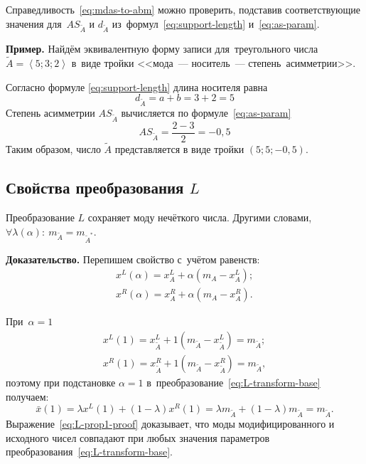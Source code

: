 Справедливость~\eqref{eq:mdas-to-abm} можно проверить, подставив соответствующие значения для~$AS_{\tilde A}$ и $d_{\tilde A}$ из~формул~\eqref{eq:support-length} и~\eqref{eq:as-param}.

\textbf{Пример.} Найдём эквивалентную форму записи для~треугольного числа $\tilde{A}=\left\langle 5;3;2 \right\rangle $ в~виде тройки <<мода~--- носитель~--- степень~асимметрии>>.

Согласно формуле \eqref{eq:support-length} длина носителя равна
\begin{equation*}
  d_{\tilde A}=a+b=3+2=5
\end{equation*}
Степень асимметрии $AS_{\tilde A}$ вычисляется по формуле~\eqref{eq:as-param}
\begin{equation*}
  AS_{\tilde A}=\frac{2-3}{2}=-0,5
\end{equation*}
Таким образом, число $\tilde{A}$ представляется в виде тройки $\left( 5;5;-0,5 \right)$.

\subsection{Свойства преобразования $L$}

\begin{prop}
\label{prop:L-prop1}
Преобразование $L$ сохраняет моду нечёткого числа. Другими словами, $\forall \lambda (\alpha ):\ m_{\tilde A}=m_{\tilde A^{*}}$.
\end{prop}
\textbf{Доказательство.} Перепишем свойство с~учётом равенств:
\begin{gather*}
  x^L(\alpha )=x_{A}^{L}+\alpha (m_A-x_{A}^{L}); \\ 
  x^R(\alpha )=x_{A}^{R}+\alpha (m_A-x_{A}^{R}).
\end{gather*}

При~$\alpha=1$ 
\begin{gather*}
  x^L(1)=x_{\tilde A}^{L}+1\left( m_{\tilde A}-x_{\tilde A}^{L} \right)=m_{\tilde A}; \\ 
  x^R(1)=x_{\tilde A}^{R}+1\left( m_{\tilde A}-x_{\tilde A}^{R} \right)=m_{\tilde A},
\end{gather*}
поэтому при подстановке $\alpha=1$ в~преобразование~\eqref{eq:L-transform-base} получаем:
\begin{equation}
\label{eq:L-prop1-proof}
  \bar{x}\left( 1 \right)=\lambda x^L\left( 1 \right)+\left( 1-\lambda  \right)x^R\left( 1 \right)=\lambda m_{\tilde A}+\left( 1-\lambda \right)m_{\tilde A}=m_{\tilde A}.
\end{equation}
Выражение~\eqref{eq:L-prop1-proof} доказывает, что моды модифицированного и исходного чисел совпадают при любых значения параметров преобразования~\eqref{eq:L-transform-base}.

